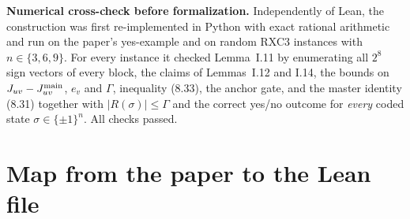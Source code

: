 \documentclass[11pt]{article}
\begin{document}
\textbf{Numerical cross-check before formalization.} Independently of Lean, the construction
was first re-implemented in Python with exact rational arithmetic and run on the paper's
yes-example and on random RXC3 instances with $n\in\{3,6,9\}$. For every instance it checked
Lemma~I.11 by enumerating all $2^8$ sign vectors of every block, the claims of Lemmas~I.12 and
I.14, the bounds on $J_{uv}-J^{\rm main}_{uv}$, $e_v$ and $\Gamma$, inequality (8.33), the anchor
gate, and the master identity (8.31) together with $|R(\sigma)|\le\Gamma$ and the correct
yes/no outcome for \emph{every} coded state $\sigma\in\{\pm1\}^n$. All checks passed.

\appendix
\section{Map from the paper to the Lean file}\label{app:map}
\end{document}
